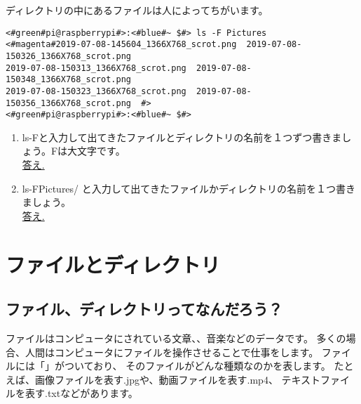 ディレクトリの中にあるファイルは人によってちがいます。
\begin{lstlisting}[caption=ls -F Pictures/コマンドの例,label=lsFPicttest]
<#green#pi@raspberrypi#>:<#blue#~ $#> ls -F Pictures
<#magenta#2019-07-08-145604_1366X768_scrot.png  2019-07-08-150326_1366X768_scrot.png  
2019-07-08-150313_1366X768_scrot.png  2019-07-08-150348_1366X768_scrot.png  
2019-07-08-150323_1366X768_scrot.png  2019-07-08-150356_1366X768_scrot.png  #>
<#green#pi@raspberrypi#>:<#blue#~ $#> 
\end{lstlisting}

\begin{tcolorbox}[title=\useOmetoi]
\begin{enumerate}
\item ls\textvisiblespace -Fと入力して出てきたファイルとディレクトリの名前を１つずつ書きましょう。Fは大文字です。\\
\underline{答え.\hspace{0.8\linewidth}}
\item ls\textvisiblespace -F\textvisiblespace Pictures/ と入力して出てきたファイルかディレクトリの名前を１つ書きましょう。\\
\underline{答え.\hspace{0.8\linewidth}}
\end{enumerate}
\end{tcolorbox}




\section{ファイルとディレクトリ}
\subsection{ファイル、ディレクトリってなんだろう？}
ファイルはコンピュータにされている文章、、音楽などのデータです。
多くの場合、人間はコンピュータにファイルを操作させることで仕事をします。
ファイルには「」がついており、
そのファイルがどんな種類なのかを表します。
たとえば、画像ファイルを表す.jpgや、動画ファイルを表す.mp4、
テキストファイルを表す.txtなどがあります。

